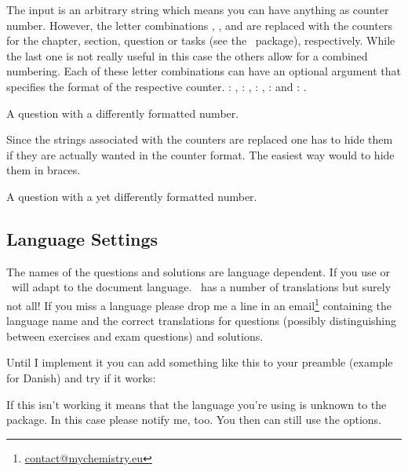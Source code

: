 \documentclass[load-preamble+]{cnltx-doc}
\begin{document}
The input is an arbitrary string which means you can have anything as counter
number.  However, the letter combinations , ,  and
 are replaced with the counters for the chapter, section, question
or tasks (see the \Tasks\ package), respectively.  While the last one is not
really useful in this case the others allow for a combined numbering.  Each of
these letter combinations can have an optional argument that specifies the
format of the respective counter. : , :
, : , :  and :
.
\begin{example}
  \begin{question}
    A question with a differently formatted number.
  \end{question}
\end{example}
Since the strings associated with the counters are replaced one has to hide
them if they are actually wanted in the counter format.  The easiest way would
to hide them in braces.
\begin{example}
  \begin{question}
    A question with a yet differently formatted number.
  \end{question}
\end{example}

\subsection{Language Settings}
The names of the questions and solutions are language dependent.  If you use
 or  \ExSheets\ will adapt to the document language.
\ExSheets\ has a number of translations but surely not all!  If you miss a
language please drop me a line in an
email\footnote{\href{mailto:contact@mychemistry.eu}{contact@mychemistry.eu}}
containing the  language name and the correct translations for
questions (possibly distinguishing between exercises and exam questions) and
solutions.

Until I implement it you can add something like this to your preamble (example
for Danish) and try if it works:
\begin{sourcecode}
\end{sourcecode}
If this isn't working it means that the language you're using is unknown to
the  package.  In this case please notify me, too.  You then
can still use the  options.
\end{document}
